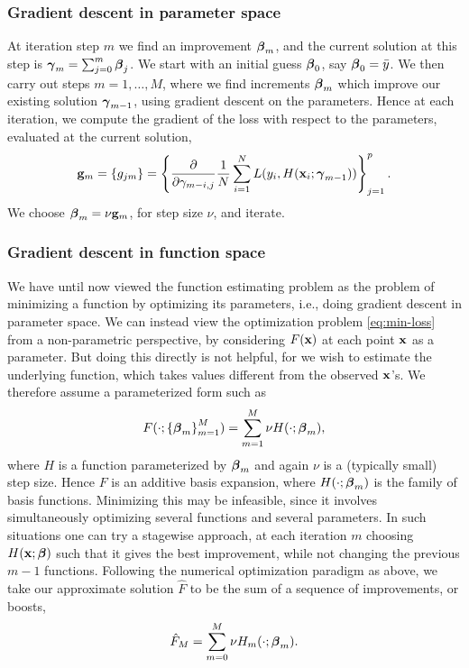 \subsubsection{Gradient descent in parameter space}
At iteration step $m$ we find an improvement $\boldsymbol{\beta}_m$, and the current solution at this step is $\boldsymbol{\gamma}_m=\sum_{j=0}^m\boldsymbol{\beta}_j$. We start with an initial guess $\boldsymbol{\beta}_0$, say $\boldsymbol{\beta}_0=\bar{y}$. We then carry out steps $m=1,\dotsc,M$, where we find increments $\boldsymbol{\beta}_m$ which improve our existing solution $\boldsymbol{\gamma}_{m-1}$, using gradient descent on the parameters. Hence at each iteration, we compute the gradient of the loss with respect to the parameters, evaluated at the current solution,
\begin{equation}
    \mathbf{g}_m=\{g_{jm}\}=\left\{\frac{\partial}{\partial\gamma_{m-i,j}}\frac{1}{N}\sum_{i=1}^NL(y_i,H(\mathbf{x}_i;\boldsymbol{\gamma}_{m-1}))\right\}_{j=1}^{p}.
\end{equation}
We choose $\boldsymbol{\beta}_m=\nu\mathbf{g}_m$, for step size $\nu$, and iterate.

\subsubsection*{Gradient descent in function space}
We have until now viewed the function estimating problem as the problem of minimizing a function by optimizing its parameters, i.e., doing gradient descent in parameter space. We can instead view the optimization problem \eqref{eq:min-loss} from a non-parametric perspective, by considering $F(\mathbf{x})$ at each point $\mathbf{x}$ as a parameter.
But doing this directly is not helpful, for we wish to estimate the underlying function, which takes values different from the observed $\mathbf{x}$'s. We therefore assume a parameterized form such as
\begin{equation}
    F(\cdot;\left\{\boldsymbol{\beta}_m\right\}_{m=1}^M)=\sum_{m=1}^M\nu H(\cdot;\boldsymbol{\beta}_m),
\end{equation}
where $H$ is a function parameterized by $\boldsymbol{\beta}_m$ and again $\nu$ is a (typically small) step size. Hence $F$ is an additive basis expansion, where $H(\cdot;\boldsymbol{\beta}_m)$ is the family of basis functions. Minimizing this may be infeasible, since it involves simultaneously optimizing several functions and several parameters. In such situations one can try a stagewise approach, at each iteration $m$ choosing $H(\mathbf{x};\boldsymbol{\beta})$ such that it gives the best improvement, while not changing the previous $m-1$ functions. Following the numerical optimization paradigm as above, we take our approximate solution $\hat{F}$ to be the sum of a sequence of improvements, or boosts,
\begin{equation}
    \hat{F}_M=\sum_{m=0}^M\nu H_m(\cdot;\boldsymbol{\beta}_m).
\end{equation}

